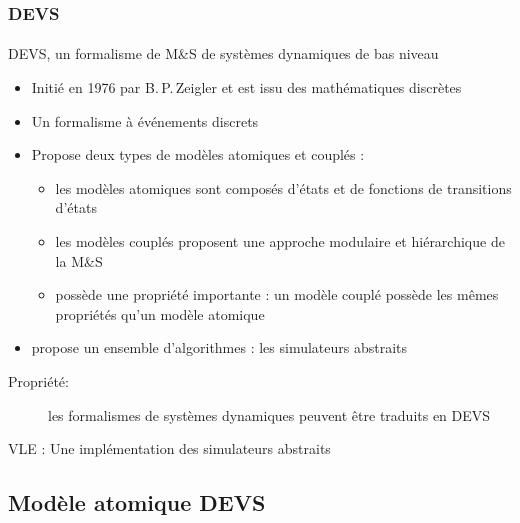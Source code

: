 \documentclass[xetex, compress, table, svgnames]{beamer}
\begin{document}
\begin{frame}
  \frametitle{DEVS}
  \framesubtitle{}
  \begin{exampleblock}{DEVS, un formalisme de M\&S de systèmes
      dynamiques de bas niveau}
    \begin{itemize}
    \item Initié en 1976 par B.\,P.\,Zeigler et est issu des
      \alert{mathématiques discrètes}
    \item Un formalisme à \alert{événements discrets}
    \item Propose deux types de modèles \alert{atomiques} et
      \alert{couplés} :
      \begin{itemize}
      \item les modèles atomiques sont composés d'\alert{états}
        et de fonctions de \alert{transitions} d'états
      \item les modèles couplés proposent une approche
        \alert{modulaire} et \alert{hiérarchique} de la M\&S
      \item possède une propriété importante : un modèle couplé
        possède les mêmes propriétés qu'un modèle atomique
      \end{itemize}
    \item propose un \alert{ensemble d'algorithmes} : les
      simulateurs abstraits
    \end{itemize}
    \pause
    \begin{description}
      \item[Propriété:] les formalismes de systèmes dynamiques
        peuvent être traduits en DEVS
    \end{description}
  \end{exampleblock}
  \pause
  \begin{alertblock}{}
    VLE : Une implémentation des simulateurs abstraits
  \end{alertblock}
\end{frame}

\subsection{Modèle atomique DEVS}
\end{document}
